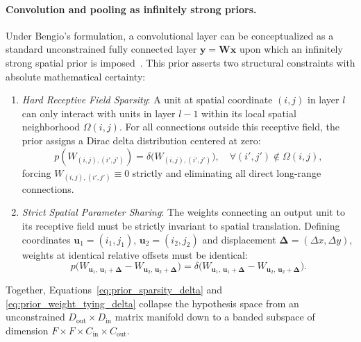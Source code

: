 \paragraph{Convolution and pooling as infinitely strong priors.}
Under Bengio's formulation, a convolutional layer can be conceptualized as a standard unconstrained fully connected layer $\mathbf{y} = \mathbf{W}\mathbf{x}$ upon which an infinitely strong spatial prior is imposed~\cite{goodfellow2016deep}. This prior asserts two structural constraints with absolute mathematical certainty:
\begin{enumerate}[leftmargin=*]
  \item \textit{Hard Receptive Field Sparsity}: A unit at spatial coordinate $(i, j)$ in layer $l$ can only interact with units in layer $l-1$ within its local spatial neighborhood $\Omega(i, j)$. For all connections outside this receptive field, the prior assigns a Dirac delta distribution centered at zero:
    \begin{equation}
    p(W_{(i, j), (i', j')}) = \delta\big( W_{(i, j), (i', j')} \big), \quad \forall (i', j') \notin \Omega(i, j),
    \label{eq:prior_sparsity_delta}
    \end{equation}
    forcing $W_{(i, j), (i', j')} \equiv 0$ strictly and eliminating all direct long-range connections.
  
  \item \textit{Strict Spatial Parameter Sharing}: The weights connecting an output unit to its receptive field must be strictly invariant to spatial translation. Defining coordinates $\mathbf{u}_1 = (i_1, j_1)$, $\mathbf{u}_2 = (i_2, j_2)$ and displacement $\boldsymbol{\Delta} = (\Delta x, \Delta y)$, weights at identical relative offsets must be identical:
    \begin{equation}
    p\big( W_{\mathbf{u}_1, \, \mathbf{u}_1 + \boldsymbol{\Delta}} - W_{\mathbf{u}_2, \, \mathbf{u}_2 + \boldsymbol{\Delta}} \big) = \delta\big( W_{\mathbf{u}_1, \, \mathbf{u}_1 + \boldsymbol{\Delta}} - W_{\mathbf{u}_2, \, \mathbf{u}_2 + \boldsymbol{\Delta}} \big).
    \label{eq:prior_weight_tying_delta}
    \end{equation}
\end{enumerate}
Together, Equations~\eqref{eq:prior_sparsity_delta} and \eqref{eq:prior_weight_tying_delta} collapse the hypothesis space from an unconstrained $D_{\text{out}} \times D_{\text{in}}$ matrix manifold down to a banded subspace of dimension $F \times F \times C_{\text{in}} \times C_{\text{out}}$.

